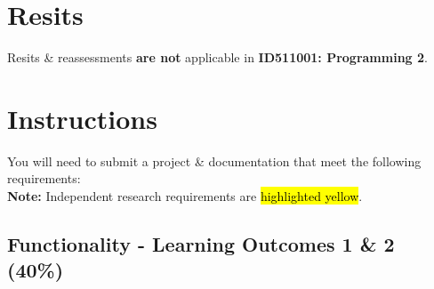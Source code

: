 \documentclass{article}
\begin{document}
\section*{Resits}
Resits \& reassessments \textbf{are not} applicable in \textbf{ID511001: Programming 2}.

\section*{Instructions}
You will need to submit a project \& documentation that meet the following requirements:\\

\textbf{Note:} Independent research requirements are \hl{highlighted yellow}.

\subsection*{Functionality - Learning Outcomes 1 \& 2 (40\%)}
\end{document}
